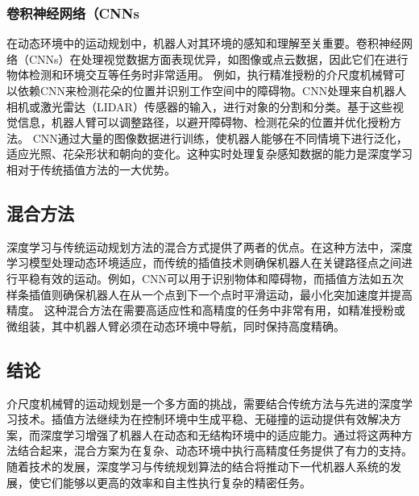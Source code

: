 \subsubsection{卷积神经网络（CNNs}
在动态环境中的运动规划中，机器人对其环境的感知和理解至关重要。卷积神经网络（CNNs）在处理视觉数据方面表现优异，如图像或点云数据，因此它们在进行物体检测和环境交互等任务时非常适用。
例如，执行精准授粉的介尺度机械臂可以依赖CNN来检测花朵的位置并识别工作空间中的障碍物。CNN处理来自机器人相机或激光雷达（LIDAR）传感器的输入，进行对象的分割和分类。基于这些视觉信息，机器人臂可以调整路径，以避开障碍物、检测花朵的位置并优化授粉方法。
CNN通过大量的图像数据进行训练，使机器人能够在不同情境下进行泛化，适应光照、花朵形状和朝向的变化。这种实时处理复杂感知数据的能力是深度学习相对于传统插值方法的一大优势。


\subsection{混合方法}
深度学习与传统运动规划方法的混合方式提供了两者的优点。在这种方法中，深度学习模型处理动态环境适应，而传统的插值技术则确保机器人在关键路径点之间进行平稳有效的运动。例如，CNN可以用于识别物体和障碍物，而插值方法如五次样条插值则确保机器人在从一个点到下一个点时平滑运动，最小化突加速度并提高精度。
这种混合方法在需要高适应性和高精度的任务中非常有用，如精准授粉或微组装，其中机器人臂必须在动态环境中导航，同时保持高度精确。

\subsection{结论}
介尺度机械臂的运动规划是一个多方面的挑战，需要结合传统方法与先进的深度学习技术。插值方法继续为在控制环境中生成平稳、无碰撞的运动提供有效解决方案，而深度学习增强了机器人在动态和无结构环境中的适应能力。通过将这两种方法结合起来，混合方案为在复杂、动态环境中执行高精度任务提供了有力的支持。随着技术的发展，深度学习与传统规划算法的结合将推动下一代机器人系统的发展，使它们能够以更高的效率和自主性执行复杂的精密任务。




